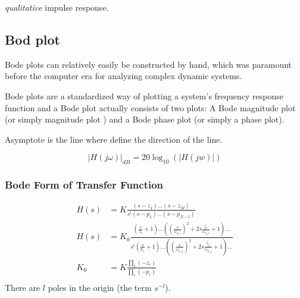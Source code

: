 \textit{qualitative} impulse response.

\newpage
\subsection{Bod plot}
Bode plots can relatively easily be constructed by hand, which was
paramount before the computer era for analyzing complex dynamic systems. \newline

Bode plots are a standardized way of plotting a system’s frequency response function
and a Bode plot actually consists of two plots: A Bode magnitude plot (or simply
magnitude plot ) and a Bode phase plot (or simply a phase plot). \newline

Asymptote is the line where define the direction of the line.


\begin{equation*}
    |H(j\omega)|_{dB} = 20\log_{10}(|H(jw)|)
\end{equation*}

\subsubsection{Bode Form of Transfer Function}
\begin{align*}
    H(s) &= K \frac{(s-z_1)\ldots(s-z_M)}{s^l(s-p_1)\ldots(s-p_{N-l})} \\
    H(s) &= K_0 \frac{ (\frac{s}{z_1}+1)\ldots((\frac{s}{\omega_{n,i}})^2+2s\frac{\zeta_i}{\omega_{n,i}}+1)\ldots }{ s^l( \frac{s}{p_1}+1) \ldots ((\frac{s}{\omega_{n,j}})^2+2s\frac{\zeta_j}{\omega_{n,j}}+1)\ldots } \\
    K_0 &= K \frac{ \prod_i(-z_i) }{ \prod_i(-p_i) } \\
\end{align*}
There are $l$ poles in the origin (the term $s^{-l}$). 

\newpage
